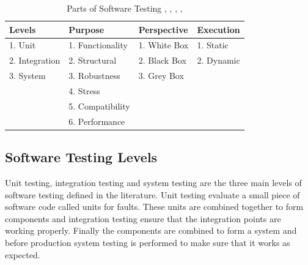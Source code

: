 \begin{table}[ht]
\caption{Parts of Software Testing \cite{adrion1982validation}, \cite{chilenski1994applicability}, \cite{gaudel2010software}, \cite{richardson1992specification}, \cite{tracey1998automated}} %
\smallskip
\centering %
\begin{tabular}{| l | l | l | l | } %
\hline

Levels 		&Purpose		 						& Perspective		& Execution 	\\
\hline
1. Unit		&1. Functionality						& 1. White Box		& 1. Static 	\\
2. Integration	&2. Structural							& 2. Black Box		& 2. Dynamic	\\
3. System		&3. Robustness						& 3. Grey Box		&			\\
			&4. Stress								&				&			\\
			&5. Compatibility						&				&			\\
			&6. Performance						&				&			\\



\hline %
\end{tabular}
\bigskip
\label{table:addvalues} %
\end{table}


\subsection{Software Testing Levels}
Unit testing, integration testing and system testing \cite{chilenski1994applicability} are the three main levels of software testing defined in the literature. Unit testing evaluate a small piece of software code called units for faults. These units are combined together to form components and integration testing ensure that the integration points are working properly. Finally the components are combined to form a system and before production system testing is performed to make sure that it works as expected. 


